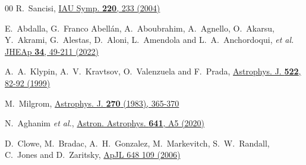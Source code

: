 \documentclass[superscriptaddress,amsmath,amssymb,nofootinbib]{revtex4}
\begin{document}
\begin{thebibliography}{00}
R.~Sancisi,
\href{https://arxiv.org/pdf/astro-ph/0311348}{IAU Symp. \textbf{220}, 233 (2004)}

E.~Abdalla, G.~Franco Abell\'an, A.~Aboubrahim, A.~Agnello, O.~Akarsu, Y.~Akrami, G.~Alestas, D.~Aloni, L.~Amendola and L.~A.~Anchordoqui, \textit{et al.}
\href{https://doi.org/10.1016/j.jheap.2022.04.002}{JHEAp \textbf{34}, 49-211 (2022)}

A.~A.~Klypin, A.~V.~Kravtsov, O.~Valenzuela and F.~Prada,
\href{https://doi.org/10.1086/307643}{Astrophys. J. \textbf{522}, 82-92 (1999)}



M.~Milgrom,
\href{https://doi.org/10.1086/161130}{Astrophys. J. \textbf{270} (1983), 365-370}



N.~Aghanim \textit{et al.}, %
\href{https://doi.org/10.1051/0004-6361/201936386}{Astron. Astrophys. \textbf{641}, A5 (2020)}


D.~Clowe, M.~Bradac, A.~H.~Gonzalez, M.~Markevitch, S.~W.~Randall, C.~Jones and D.~Zaritsky,
\href{http://iopscience.iop.org/article/10.1086/508162/meta}{ApJL 648 109 (2006)}






\end{thebibliography}
\end{document}
